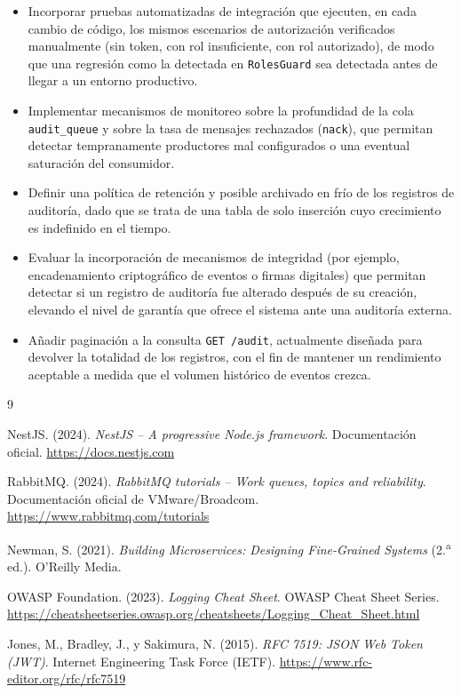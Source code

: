 \documentclass[12pt,letterpaper]{article}
\begin{document}
\begin{itemize}
  \item Incorporar pruebas automatizadas de integración que ejecuten, en cada cambio de código, los mismos escenarios de autorización verificados manualmente (sin token, con rol insuficiente, con rol autorizado), de modo que una regresión como la detectada en \texttt{RolesGuard} sea detectada antes de llegar a un entorno productivo.
  \item Implementar mecanismos de monitoreo sobre la profundidad de la cola \texttt{audit\_queue} y sobre la tasa de mensajes rechazados (\texttt{nack}), que permitan detectar tempranamente productores mal configurados o una eventual saturación del consumidor.
  \item Definir una política de retención y posible archivado en frío de los registros de auditoría, dado que se trata de una tabla de solo inserción cuyo crecimiento es indefinido en el tiempo.
  \item Evaluar la incorporación de mecanismos de integridad (por ejemplo, encadenamiento criptográfico de eventos o firmas digitales) que permitan detectar si un registro de auditoría fue alterado después de su creación, elevando el nivel de garantía que ofrece el sistema ante una auditoría externa.
  \item Añadir paginación a la consulta \texttt{GET /audit}, actualmente diseñada para devolver la totalidad de los registros, con el fin de mantener un rendimiento aceptable a medida que el volumen histórico de eventos crezca.
\end{itemize}

\newpage

\begin{thebibliography}{9}

NestJS. (2024). \emph{NestJS -- A progressive Node.js framework}. Documentación oficial. \url{https://docs.nestjs.com}

RabbitMQ. (2024). \emph{RabbitMQ tutorials -- Work queues, topics and reliability}. Documentación oficial de VMware/Broadcom. \url{https://www.rabbitmq.com/tutorials}

Newman, S. (2021). \emph{Building Microservices: Designing Fine-Grained Systems} (2.\textsuperscript{a} ed.). O'Reilly Media.

OWASP Foundation. (2023). \emph{Logging Cheat Sheet}. OWASP Cheat Sheet Series. \url{https://cheatsheetseries.owasp.org/cheatsheets/Logging_Cheat_Sheet.html}

Jones, M., Bradley, J., y Sakimura, N. (2015). \emph{RFC 7519: JSON Web Token (JWT)}. Internet Engineering Task Force (IETF). \url{https://www.rfc-editor.org/rfc/rfc7519}

\end{thebibliography}
\end{document}

